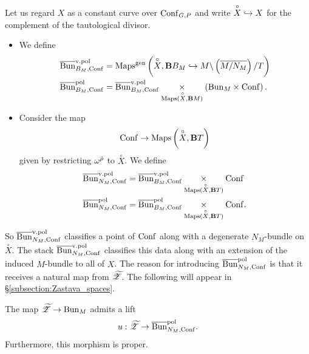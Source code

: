 \subsubsection{} Let us regard $X$ as a constant curve over $\mathrm{Conf}_{G,P}$ and write $\overset{\circ}{X} \hookrightarrow X$ for the complement of the tautological divisor.
\begin{itemize}
    \item We define
    \begin{align*}
        \overline{\mathrm{Bun}}_{B_M, \mathrm{Conf}}^{\mathrm{v.}\mathrm{pol}} &= \mathrm{Maps}^{\mathrm{gen}} \left(\overset{\circ}{X}, \mathbf{B} B_M \hookrightarrow M \backslash \left(\overline{M / N_M}\right)/T \right)  \\
        \overline{\mathrm{Bun}}_{B_M, \mathrm{Conf}}^{\mathrm{pol}} &= \overline{\mathrm{Bun}}_{B_M, \mathrm{Conf}}^{\mathrm{v.}\mathrm{pol}} \underset{\mathrm{Maps}(\overset{\circ}{X}, \mathbf{B} M)}{\times} \left( \mathrm{Bun}_M \times \mathrm{Conf} \right).
    \end{align*}
    \item Consider the map
        \[\mathrm{Conf} \to \mathrm{Maps}\left(\overset{\circ}{X}, \mathbf{B} T\right)\]
    given by restricting $\omega^{\check{\rho}}$ to $\overset{\circ}{X}$. We define
    \begin{align*}
    \overline{\mathrm{Bun}}_{N_M, \mathrm{Conf}}^{\mathrm{v.}\mathrm{pol}} &= \overline{\mathrm{Bun}}_{B_M, \mathrm{Conf}}^{\mathrm{v.}\mathrm{pol}} \underset{\mathrm{Maps}(\overset{\circ}{X}, \mathbf{B} T)}{\times} \mathrm{Conf}  \\
    \overline{\mathrm{Bun}}_{N_M, \mathrm{Conf}}^{\mathrm{pol}} &= \overline{\mathrm{Bun}}_{B_M, \mathrm{Conf}}^{\mathrm{pol}} \underset{\mathrm{Maps}(\overset{\circ}{X}, \mathbf{B} T)}{\times} \mathrm{Conf}.
    \end{align*}
\end{itemize}
So $\overline{\mathrm{Bun}}_{N_M, \mathrm{Conf}}^{\mathrm{v.}\mathrm{pol}}$ classifies a point of $\mathrm{Conf}$ along with a degenerate $N_M$-bundle on $\overset{\circ}{X}$. The stack $\overline{\mathrm{Bun}}_{N_M, \mathrm{Conf}}^{\mathrm{v.}\mathrm{pol}}$ classifies this data along with an extension of the induced $M$-bundle to all of $X$. The reason for introducing $\overline{\mathrm{Bun}}_{N_M, \mathrm{Conf}}^{\mathrm{pol}}$ is that it receives a natural map from ${\widetilde{\mathscr{Z}}}$. The following will appear in \S\ref{subsection:Zastava_spaces}.

\begin{construction}
\label{construction:zast_u_lift}
The map ${\widetilde{\mathscr{Z}}} \to \mathrm{Bun}_M$ admits a lift
    \[u : {\widetilde{\mathscr{Z}}} \to \overline{\mathrm{Bun}}_{N_M, \mathrm{Conf}}^{\mathrm{pol}}.\]
Furthermore, this morphism is proper.
\end{construction}

